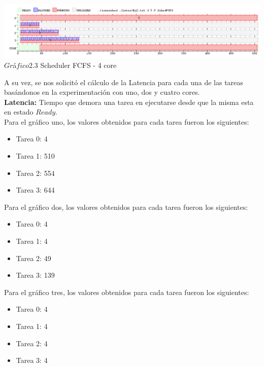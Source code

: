   \vspace*{0.3cm} \vspace*{0.3cm}
  \begin{center}
 \includegraphics[scale=0.5]{ej24nucleo.png}
 { $Gr$\'a$fico 2.3$ Scheduler FCFS - 4 core }
 \end{center}
  \vspace*{0.3cm}

A su vez, se nos solicit\'{o} el c\'{a}lculo de la Latencia para cada una de las tareas bas\'{a}ndonos en la 
experimentaci\'{o}n con uno, dos y cuatro cores.\\

\textbf{Latencia:} Tiempo que demora una tarea en ejecutarse desde que la misma esta en estado $Ready$.\\

\indent Para el gr\'{a}fico uno, los valores obtenidos para cada tarea fueron los siguientes:\\

\begin{itemize}
 \item Tarea 0: 4
 \item Tarea 1: 510
 \item Tarea 2: 554
  \item Tarea 3: 644
\end{itemize}

\indent Para el gr\'{a}fico dos, los valores obtenidos para cada tarea fueron los siguientes:\\

\begin{itemize}
 \item Tarea 0: 4
 \item Tarea 1: 4
 \item Tarea 2: 49
  \item Tarea 3: 139
\end{itemize}

\indent Para el gr\'{a}fico tres, los valores obtenidos para cada tarea fueron los siguientes:\\

\begin{itemize}
 \item Tarea 0: 4
 \item Tarea 1: 4
 \item Tarea 2: 4
  \item Tarea 3: 4
\end{itemize}

